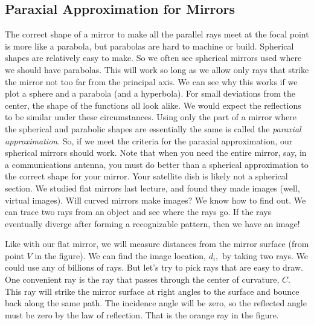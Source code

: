 \documentclass{article}
\begin{document}
\subsection{Paraxial Approximation for Mirrors}

The correct shape of a mirror to make all the parallel rays meet at the
focal point is more like a parabola, but parabolas are hard to machine or
build. Spherical shapes are relatively easy to make. So we often see
spherical mirrors used where we should have parabolas. This will work so
long as we allow only rays that strike the mirror not too far from the
principal axis. We can see why this works if we plot a sphere and a parabola
(and a hyperbola). For small deviations from the center, the shape of the
functions all look alike. We would expect the reflections
to be similar under these circumstances. Using only the part of a mirror
where the spherical and parabolic shapes are essentially the same is called
the \emph{paraxial approximation}. So, if we meet the criteria for the
paraxial approximation, our spherical mirrors should work. Note that when
you need the entire mirror, say, in a communications antenna, you must do
better than a spherical approximation to the correct shape for your mirror.
Your satellite dish is likely not a spherical section. We studied flat
mirrors last lecture, and found they made images (well, virtual images).
Will curved mirrors make images? We know how to find out. We can trace two
rays from an object and see where the rays go. If the rays eventually
diverge after forming a recognizable pattern, then we have an image!

Like with our flat mirror, we will measure distances from the mirror surface
(from point $V$ in the figure). We can find the image location, $d_{i},$ by
taking two rays. We could use any of billions of rays. But let's try to pick
rays that are easy to draw. One convenient ray is the ray that passes
through the center of curvature, $C.$ This ray will strike the mirror
surface at right angles to the surface and bounce back along the same path.
The incidence angle will be zero, so the reflected angle must be zero by the
law of reflection. That is the orange ray in the figure.
\end{document}
